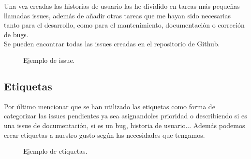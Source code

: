 Una vez creadas las historias de usuario las he dividido en tareas más pequeñas llamadas issues, 
además de añadir otras tareas que me hayan sido necesarias tanto para el desarrollo, como para el mantenimiento, 
documentación o correción de bugs.\\
Se pueden encontrar todas las issues creadas en el repositorio de Github\cite{issues}.

\begin{figure}[H]
	\centering
	\noindent{}
	\caption{Ejemplo de issue.}
  	\end{figure}


\newpage
\subsection{Etiquetas}

Por último mencionar que se han utilizado las etiquetas como forma de categorizar las issues pendientes ya sea asignandoles prioridad o describiendo si es una issue de documentación, si es un bug, historia de usuario...
Además podemos crear etiquetas a nuestro gusto según las necesidades que tengamos.

\begin{figure}[H]
	\centering
	\noindent{}
	\caption{Ejemplo de etiquetas.}
	\end{figure}